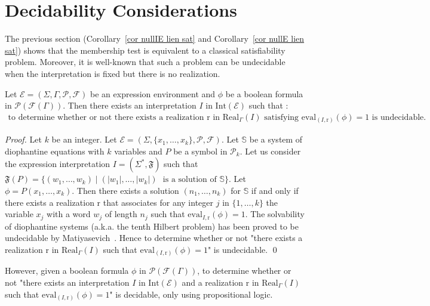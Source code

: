\documentclass[a4paper]{llncs}
\begin{document}
  \section{Decidability Considerations}\label{sec:decidab}
  
  The previous section (Corollary~\ref{cor nullIE lien sat} and Corollary~\ref{cor nullE lien sat}) shows that the membership test is equivalent to a classical satisfiability problem. Moreover, it is well-known that such a problem can be undecidable when the interpretation is fixed but there is no realization.
  
   \begin{theorem}
     Let $\mathcal{E}=(\Sigma,\Gamma,\mathcal{P},\mathcal{F})$ be an expression environment and $\phi$ be a boolean formula in $\mathcal{P}(\mathcal{F}(\Gamma))$. Then there exists an interpretation $I$ in $\mathrm{Int}(\mathcal{E})$ such that :
     \begin{align*}
      \text{to determine whether or not there exists a realization $\mathrm{r}$ in $\mathrm{Real}_\Gamma(I)$ satisfying $\mathrm{eval}_{(I,\mathrm{r})}(\phi)=1$ is undecidable.}
     \end{align*}
   \end{theorem}   
   \begin{proof}
      Let $k$ be an integer. Let $\mathcal{E}=(\Sigma,\{x_1,\ldots,x_k\},\mathcal{P},\mathcal{F})$. Let $\mathbb{S}$ be a system of diophantine equations with $k$ variables and $P$ be a symbol in $\mathcal{P}_k$.      
     Let us consider the expression interpretation $I=(\Sigma^*,\mathfrak{F})$ such that $\mathfrak{F}(P)=\{(w_1,\ldots,w_k)\mid (|w_1|,\ldots,|w_k|)$ $\text{ is a solution of } \mathbb{S}\}$.
     Let $\phi= P(x_1,\ldots,x_k)$. 
     Then there exists a solution $(n_1,\ldots,n_k)$ for $\mathbb{S}$ if and only if there exists a realization $\mathrm{r}$ that associates for any integer $j$ in $\{1,\ldots,k\}$ the variable $x_j$ with a word $w_j$ of length $n_j$ such that $\mathrm{eval}_{I,\mathrm{r}}(\phi)=1$.
     The solvability of diophantine systems (a.k.a. the tenth Hilbert problem) has been proved to be undecidable by Matiyasevich~\cite{My93}. 
     Hence to determine whether or not "there exists a realization $\mathrm{r}$ in $\mathrm{Real}_\Gamma(I)$ such that $\mathrm{eval}_{(I,\mathrm{r})}(\phi)=1$" is undecidable.
     \qed
   \end{proof}
  
  However, given a boolean formula $\phi$ in $\mathcal{P}(\mathcal{F}(\Gamma))$, to determine whether or not "there exists an interpretation $I$ in $\mathrm{Int}(\mathcal{E})$ and a realization $\mathrm{r}$ in $\mathrm{Real}_\Gamma(I)$ such that $\mathrm{eval}_{(I,\mathrm{r})}(\phi)=1$" is decidable, only using propositional logic.
  
\end{document}
